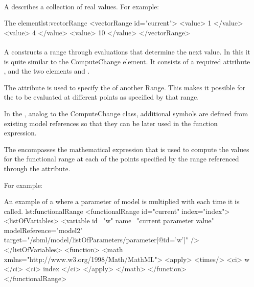 \paragraph{}
\label{class:vectorRange}
A  describes a collection of real values. For example:
\begin{myXmlLst}{The  element}{lst:vectorRange}
    <vectorRange id="current"> 
        <value> 1 </value> 
        <value> 4 </value> 
        <value> 10 </value> 
    </vectorRange> 
\end{myXmlLst}

\paragraph{}
\label{class:functionalRange}
A  constructs a range through evaluations that determine the next value. In this it is quite similar to the \hyperref[class:computeChange]{ComputeChange} element. It consists of a required attribute , and the two elements  and .

The attribute  is used to specify the  of another Range. This makes it possible for the  to be evaluated at different points as specified by that range.

In the , analog to the \hyperref[class:computeChange]{ComputeChange} class,  additional symbols are defined from existing model references so that they can be later used in the function expression. 

The  encompasses the mathematical expression that is used to compute the values for the functional range at each of the points specified by the range referenced through the  attribute. 

For example:

\begin{myXmlLst}{An example of a  where a parameter  of model  is multiplied with  each time it is called. }{lst:functionalRange}
    <functionalRange id="current" index="index"> 
      <listOfVariables> 
         <variable id="w" name="current parameter value"   
				                  modelReference="model2"
                          target="/sbml/model/listOfParameters/parameter[@id='w']" /> 
      </listOfVariables> 
      <function>
        <math xmlns="http://www.w3.org/1998/Math/MathML"> 
           <apply>
           <times/>
           <ci> w </ci> 
           <ci> index </ci> 
           </apply>
        </math>  
      </function>
    </functionalRange> 
\end{myXmlLst}

